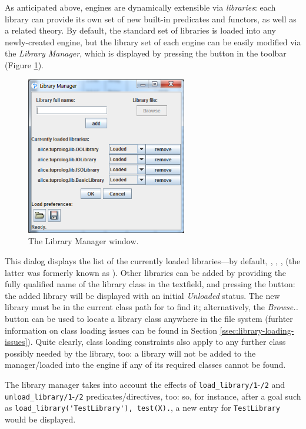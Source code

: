 As anticipated above, \tuprolog{} engines are dynamically extensible via \textit{libraries}: each library can provide its own set of new built-in
predicates and functors, as well as a related theory.
%
By default, the standard set of libraries is loaded into any newly-created engine, but the library set of each engine can be easily modified via the \textit{Library Manager}, which is displayed by pressing the  button in the toolbar (Figure \ref{fig:gui-library-manager}).

\begin{figure}
\centering
\includegraphics[width=7cm]{images/gui-library-manager}
\caption{The Library Manager window.}
\label{fig:gui-library-manager}
\end{figure}

This dialog displays the list of the currently loaded libraries---by default,
, , ,  (the latter was formerly known as ).
%
Other libraries can be added by providing the fully qualified name of the library class in the textfield, and pressing the  button: the added library will be displayed with an initial \textit{Unloaded} status.
The new library must be in the current class path for \tuprolog{} to find it; alternatively, the \textit{Browse..} button can be used to locate a library class anywhere in the file system (furhter information on class loading issues can be found in Section \ref{ssec:library-loading-issues}).
%
Quite clearly, class loading constraints also apply to any further class possibly needed by the library, too: a library will not be added to the manager/loaded into the engine if any of its required classes cannot be found.

The library manager takes into account the effects of \verb|load_library/1|-\verb|/2| and \verb|unload_library/1|-\verb|/2| predicates/directives, too: so, for instance, after a goal such as \verb|load_library('TestLibrary'), test(X).|, a new entry for \verb|TestLibrary| would be displayed.


